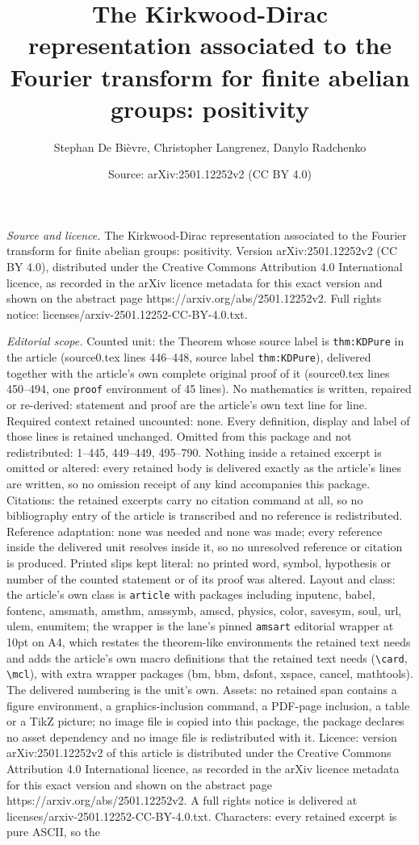 \documentclass[10pt,a4paper]{amsart}
\title[The Kirkwood-Dirac representation associated to the Fourier ]{The Kirkwood-Dirac representation associated to the Fourier transform for finite abelian groups: positivity}
\author{Stephan De Bi\`evre, Christopher Langrenez, Danylo Radchenko}
\date{Source: arXiv:2501.12252v2 (CC BY 4.0)}
\begin{document}
\maketitle

\noindent\emph{Source and licence.} The Kirkwood-Dirac representation associated to the Fourier transform for finite abelian groups: positivity. Version arXiv:2501.12252v2 (CC BY 4.0), distributed under the Creative Commons Attribution 4.0 International licence, as recorded in the arXiv licence metadata for this exact version and shown on the abstract page https://arxiv.org/abs/2501.12252v2. Full rights notice: licenses/arxiv-2501.12252-CC-BY-4.0.txt.\par\smallskip

\noindent\textit{Editorial scope.} Counted unit: the Theorem whose source label is \texttt{thm:KDPure} in the article (source0.tex lines 446--448, source label \texttt{thm:KDPure}), delivered together with the article's own complete original proof of it (source0.tex lines 450--494, one \texttt{proof} environment of 45 lines). No mathematics is written, repaired or re-derived: statement and proof are the article's own text line for line. Required context retained uncounted: none. Every definition, display and label of those lines is retained unchanged. Omitted from this package and not redistributed: 1--445, 449--449, 495--790. Nothing inside a retained excerpt is omitted or altered: every retained body is delivered exactly as the article's lines are written, so no omission receipt of any kind accompanies this package. Citations: the retained excerpts carry no citation command at all, so no bibliography entry of the article is transcribed and no reference is redistributed. Reference adaptation: none was needed and none was made; every reference inside the delivered unit resolves inside it, so no unresolved reference or citation is produced. Printed slips kept literal: no printed word, symbol, hypothesis or number of the counted statement or of its proof was altered. Layout and class: the article's own class is \texttt{article} with packages including inputenc, babel, fontenc, amsmath, amsthm, amssymb, amscd, physics, color, savesym, soul, url, ulem, enumitem; the wrapper is the lane's pinned \texttt{amsart} editorial wrapper at 10pt on A4, which restates the theorem-like environments the retained text needs and adds the article's own macro definitions that the retained text needs (\texttt{\textbackslash card}, \texttt{\textbackslash mcl}), with extra wrapper packages (bm, bbm, dsfont, xspace, cancel, mathtools). The delivered numbering is the unit's own. Assets: no retained span contains a figure environment, a graphics-inclusion command, a PDF-page inclusion, a table or a TikZ picture; no image file is copied into this package, the package declares no asset dependency and no image file is redistributed with it. Licence: version arXiv:2501.12252v2 of this article is distributed under the Creative Commons Attribution 4.0 International licence, as recorded in the arXiv licence metadata for this exact version and shown on the abstract page https://arxiv.org/abs/2501.12252v2. A full rights notice is delivered at licenses/arxiv-2501.12252-CC-BY-4.0.txt. Characters: every retained excerpt is pure ASCII, so the 
\end{document}
